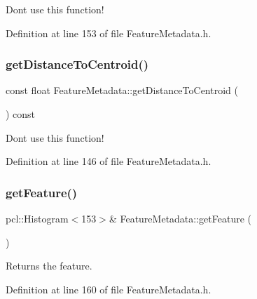 Don\textquotesingle{}t use this function! 

Definition at line 153 of file Feature\+Metadata.\+h.

\mbox{\label{class_feature_metadata_a4736658ecb89297dd9bad9c701f59e8f}} 
\subsubsection{\texorpdfstring{get\+Distance\+To\+Centroid()}{getDistanceToCentroid()}}
{\footnotesize\ttfamily const float Feature\+Metadata\+::get\+Distance\+To\+Centroid (\begin{DoxyParamCaption}{ }\end{DoxyParamCaption}) const\hspace{0.3cm}{\ttfamily [inline]}}

Don\textquotesingle{}t use this function! 

Definition at line 146 of file Feature\+Metadata.\+h.

\mbox{\label{class_feature_metadata_a92f0b1da1d3892508fa358a58946060a}} 
\subsubsection{\texorpdfstring{get\+Feature()}{getFeature()}}
{\footnotesize\ttfamily pcl\+::\+Histogram$<$153$>$\& Feature\+Metadata\+::get\+Feature (\begin{DoxyParamCaption}{ }\end{DoxyParamCaption})\hspace{0.3cm}{\ttfamily [inline]}}

Returns the feature. 

Definition at line 160 of file Feature\+Metadata.\+h.

\mbox{\label{class_feature_metadata_a0ba779c2a9d106b987edc306b14f3191}} 
